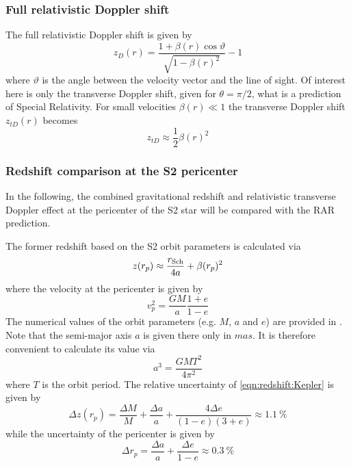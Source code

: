 \documentclass[nofootinbib,tightenlines,nobibnotes,aps,prl,preprint,superscriptaddress]{revtex4-1}
\begin{document}
\subsubsection*{Full relativistic Doppler shift}
The full relativistic Doppler shift is given by \begin{equation}
	\label{eqn:Doppler-shift}
	z_D(r) = \frac{1 + \beta(r) \cos\vartheta}{\sqrt{1 - \beta(r)^2}} - 1
\end{equation} where $\vartheta$ is the angle between the velocity vector and the line of sight. Of interest here is only the transverse Doppler shift, given for $\theta=\pi/2$, what is a prediction of Special Relativity. For small velocities $\beta(r) \ll 1$ the transverse Doppler shift $z_{tD}(r)$ becomes \begin{equation}
	z_{tD} \approx \frac12 \beta(r)^2
\end{equation}


\subsubsection*{Redshift comparison at the S2 pericenter}
In the following, the combined gravitational redshift and relativistic transverse Doppler effect at the pericenter of the S2 star will be compared with the RAR prediction.

The former redshift based on the S2 orbit parameters is calculated via \begin{equation}
	\label{eqn:redshift:Kepler}
	z(r_p) \approx \frac{r_{\rm Sch}}{4a} + \beta(r_p)^2
\end{equation} where the velocity at the pericenter is given by \begin{equation}
	v_p^2 = \frac{G M}{a} \frac{1 + e}{1 - e}
\end{equation} The numerical values of the orbit parameters (e.g. $M$, $a$ and $e$) are provided in \citet[][Table A.1]{2018A&A...615L..15G}. Note that the semi-major axis $a$ is given there only in $mas$. It is therefore convenient to calculate its value via \begin{equation}
	a^3 = \frac{G M T^2}{4 \pi^2}
\end{equation} where $T$ is the orbit period. The relative uncertainty of \cref{eqn:redshift:Kepler} is given by \begin{equation}
	\Delta z(r_p) = \frac{\Delta M}{M} + \frac{\Delta a}{a} + \frac{4 \Delta e}{(1 - e)(3 + e)} \approx \SI{1.1}{\percent}
\end{equation} while the uncertainty of the pericenter is given by \begin{equation}
	\Delta r_p = \frac{\Delta a}{a} + \frac{\Delta e}{1 - e} \approx \SI{0.3}{\percent}
\end{equation}
\end{document}
